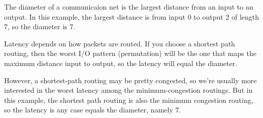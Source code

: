 \begin{problem}[4]
  The diameter of a communicaion net is the largest distance from an input
  to an output.  In this example, the largest distance is from input 0 to
  output 2 of length 7, so the diameter is 7.

  Latency depends on how packets are routed.  If you choose a shortest
  path routing, then the worst I/O pattern (permutation) will be the one
  that maps the maximum distance input to output, so the latency will
  equal the diameter.

  However, a shortest-path routing may be pretty congested, so we're
  usually more interested in the worst latency among the
  minimum-congestion routings.  But in this example, the shortest path
  routing is also the minimum congestion routing, so the latency is any
  case equals the diameter, namely 7.
  
\end{problem}



